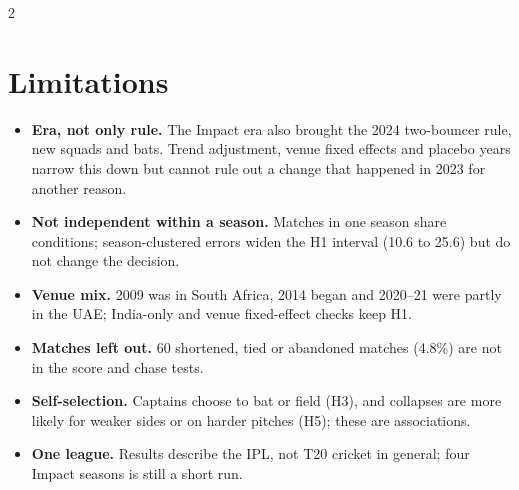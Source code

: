 \documentclass[10pt,a4paper]{article}
\begin{document}
\begin{multicols}{2}
\raggedcolumns
\section{Limitations}
\begin{itemize}
\item \textbf{Era, not only rule.} The Impact era also brought the 2024 two-bouncer rule, new squads and bats. Trend adjustment, venue fixed effects and placebo years narrow this down but cannot rule out a change that happened in 2023 for another reason.
\item \textbf{Not independent within a season.} Matches in one season share conditions; season-clustered errors widen the H1 interval (10.6 to 25.6) but do not change the decision.
\item \textbf{Venue mix.} 2009 was in South Africa, 2014 began and 2020--21 were partly in the UAE; India-only and venue fixed-effect checks keep H1.
\item \textbf{Matches left out.} 60 shortened, tied or abandoned matches (4.8\%) are not in the score and chase tests.
\item \textbf{Self-selection.} Captains choose to bat or field (H3), and collapses are more likely for weaker sides or on harder pitches (H5); these are associations.
\item \textbf{One league.} Results describe the IPL, not T20 cricket in general; four Impact seasons is still a short run.
\end{itemize}

\end{multicols}
\end{document}
